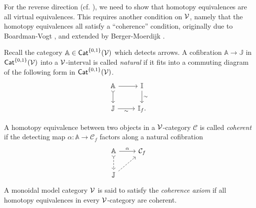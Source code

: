 \documentclass[a4paper,10pt
,draft
]{article}%
\newcommand{\I}{\mathbb I}
\newcommand{\J}{\mathbb J}
\renewcommand{\1}{\eta}%
\begin{document}



For the reverse direction (cf. \cite[\S 2]{BM13}), we need to show that
homotopy equivalences are all virtual equivalences.
This requires another condition on $\mathcal V$, namely that the homotopy equivalences all satisfy a ``coherence'' condition,
originally due to Boardman-Vogt \cite{BV73}, and extended by Berger-Moerdijk \cite{BM13}.

\begin{definition}
      Recall the category $\mathbb A \in \mathsf{Cat}^{\left\{0,1\right\}}(\mathcal V)$ which detects arrows.
      A cofibration $\mathbb A \to \J$ in $\mathsf{Cat}^{\left\{0,1\right\}}(\mathcal V)$ into a $\mathcal V$-interval is called \textit{natural} if
      it fits into a commuting diagram of the following form in $\mathsf{Cat}^{\left\{0,1\right\}}(\mathcal V)$.
      \begin{equation}
            \begin{tikzcd}
                  \mathbb A \arrow[d, tail] \arrow[r]
                  &
                  \I \arrow[d, "\sim"]
                  \\
                  \J \arrow[r, "\sim"']
                  &
                  \I_f.
            \end{tikzcd}
      \end{equation}

      A homotopy equivalence between two objects in a $\mathcal V$-category $\mathcal C$ is called \textit{coherent} if
      the detecting map $\alpha: \mathbb A \to \mathcal C_f$ factors along a natural cofibration
      \begin{equation}
            \begin{tikzcd}
                  \mathbb A \arrow[r, "\alpha"] \arrow[d, tail, dashed]
                  &
                  \mathcal C_f
                  \\
                  \J \arrow[ur, dashed]
            \end{tikzcd}
      \end{equation}
      A monoidal model category $\mathcal V$ is said to satisfy the \textit{coherence axiom} if
      all homotopy equivalences in every $\mathcal V$-category are coherent.
\end{definition}
\end{document}
